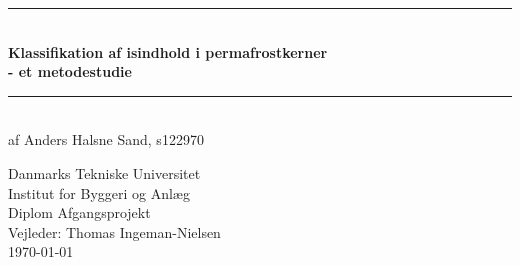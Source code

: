 \begin{titlingpage}

\begin{myenvironment}
\centering \parindent=0pt
\newcommand{\HRule}{\rule{\textwidth}{1mm}}
 \HRule\\[1cm]\Huge\bfseries
Klassifikation af isindhold i permafrostkerner \\[0.7cm]
\large - et metodestudie\\[1cm]
\HRule\\[1cm]  \large af Anders Halsne Sand, s122970\\
 \normalsize %
\end{myenvironment}
\vfill
\begin{myenvironment}
\begin{flushleft}
Danmarks Tekniske Universitet\\
Institut for Byggeri og Anlæg\\
Diplom Afgangsprojekt\\
Vejleder: Thomas Ingeman-Nielsen\\
\today \end{flushleft}
\end{myenvironment}

\end{titlingpage}
\restoregeometry